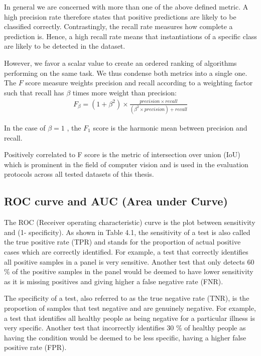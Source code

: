 In general we are concerned with more than one of the above defined metric.
A high precision rate therefore states that positive predictions are likely to be classified correctly. Contrastingly, the recall rate measures how complete a prediction is. Hence, a high recall rate means that instantiations of a specific class are likely to be detected in the dataset.

However, we favor a scalar value to create an ordered ranking of algorithms performing on the same task. We thus condense both metrics into a single one. The $F$ score  measure weights precision and recall according to a weighting factor such that recall has $\beta$ times more weight than precision:
\begin{equation}
\begin{split}
F_{\beta }=\left ( 1+\beta ^{2} \right )\times \frac{precision\times recall}{\left (\beta ^{2}\times precision \right )+recall }
\label{}
\end{split}
\end{equation}

In the case of $ \beta = 1$ , the $F_{1 }$ score is the harmonic mean between precision and recall.

Positively correlated to F score is the metric of intersection over union (IoU) which is prominent in the field of computer vision and is used in the evaluation protocols across all tested datasets of this thesis.




\subsection{ROC curve and AUC (Area under Curve)}
The ROC (Receiver operating characteristic) curve is the plot between sensitivity and (1- specificity). As shown in Table 4.1, the sensitivity of a test is also called the true positive rate (TPR) and stands for the proportion of actual positive cases which are correctly identified. For example, a test that correctly identifies all positive samples in a panel is very sensitive. Another test that only detects 60 \% of the positive samples in the panel would be deemed to have lower sensitivity as it is missing positives and giving higher a false negative rate (FNR).

The specificity of a test, also referred to as the true negative rate (TNR), is the proportion of samples that test negative and are genuinely negative. For example, a test that identifies all healthy people as being negative for a particular illness is very specific. Another test that incorrectly identifies 30 \% of healthy people as having the condition would be deemed to be less specific, having a higher false positive rate (FPR).

